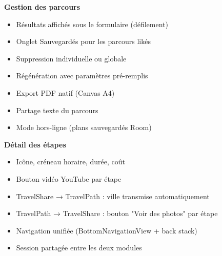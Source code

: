 \documentclass[a4paper,12pt,openany]{report}
\begin{document}
\begin{tcolorbox}
\begin{multicols}{2}
\textbf{Gestion des parcours}
\begin{itemize}[leftmargin=*,itemsep=0pt,topsep=2pt]
  \item Résultats affichés sous le formulaire (défilement)
  \item Onglet Sauvegardés pour les parcours likés
  \item Suppression individuelle ou globale
  \item Régénération avec paramètres pré-remplis
  \item Export PDF natif (Canvas A4)
  \item Partage texte du parcours
  \item Mode hors-ligne (plans sauvegardés Room)
\end{itemize}

\textbf{Détail des étapes}
\begin{itemize}[leftmargin=*,itemsep=0pt,topsep=2pt]
  \item Icône, créneau horaire, durée, coût
  \item Bouton vidéo YouTube par étape
\end{itemize}
\end{multicols}
\end{tcolorbox}

\vspace{8pt}

\begin{tcolorbox}[enhanced, colback=okbg, colframe=greentxt, arc=4pt,
  boxrule=0.6pt, left=8pt, right=8pt, top=6pt, bottom=6pt,
  title={\textbf{Passerelle — Intégration bidirectionnelle}},
  fonttitle=\bfseries\small\color{white},
  colbacktitle=greentxt]
\small
\begin{multicols}{2}
\begin{itemize}[leftmargin=*,itemsep=0pt,topsep=2pt]
  \item TravelShare → TravelPath : ville transmise automatiquement
  \item TravelPath → TravelShare : bouton "Voir des photos" par étape
\end{itemize}
\columnbreak
\begin{itemize}[leftmargin=*,itemsep=0pt,topsep=2pt]
  \item Navigation unifiée (BottomNavigationView + back stack)
  \item Session partagée entre les deux modules
\end{itemize}
\end{multicols}
\end{tcolorbox}
\end{document}
